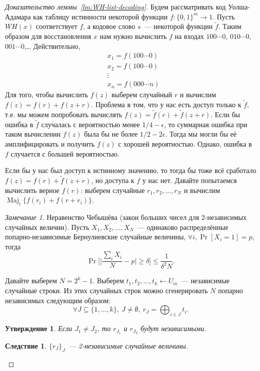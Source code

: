 \documentclass[12pt]{article}
\DeclareMathOperator{\maj}{Maj}
\theoremstyle{definition}
\theoremstyle{plain}
\newtheorem{statement}{Утверждение}[section]
\newtheorem{corollary}{Следствие}[section]
\theoremstyle{remark}
\newtheorem{remark}{Замечание}[section]
\begin{document}
\begin{proof}[Доказательство леммы~\ref*{lm:WH-list-decoding}]
Будем рассматривать код Уолша-Адамара как таблицу истинности некоторой функции $f:\{0,1\}^m\to 1$.
Пусть $WH(x)$ соответствует $f$, а кодовое слово $s$~--- некоторой функции $\tilde{f}$. Таким 
образом для восстановления $x$ нам нужно вычислить $f$ на входах $100\dotsb0$, $010\dotsb0$, $001\dotsb0$,\ldots
Действительно, 
$$
\begin{aligned}
&x_1 = f(100\dotsb0)\\
&x_2 = f(100\dotsb0)\\
&\vdots\\
&x_n = f(000\dotsb n)
\end{aligned}
$$
Для того, чтобы вычислить $f(z)$ выберем случайный $r$ и вычислим
$f(z) = f(r) + f(z + r).$
Проблема в том, что у нас есть доступ только к $\tilde{f}$, т.е.
мы можем попробовать вычислять $f(z) = \tilde{f}(r) + \tilde{f}(z + r).$
Если бы ошибка в $\tilde{f}$ случалась с вероятностью менее $1/4-\epsilon$,
то суммарная ошибка при таком вычислении $f(z)$ была бы не более $1/2 - 2\epsilon$.
Тогда мы могли бы её амплифицировать и получить $f(z)$ с хорошей вероятностью.
Однако, ошибка в $f$ случается с большей вероятностью.

Если бы у нас был доступ к истинному значению, то тогда бы тоже всё сработало
$f(z) = f(r) + \tilde{f}(z + r)$, но доступа к $f$ у нас нет. Давайте попытаемся
вычислить верное $f(r)$: выберем случайные $r_1,r_2,\dotsc,r_N$ и вычислим $\maj_i\{f(r_i) + f(r + r_i)\}$.

\begin{remark}{Неравенство Чебышёва (закон больших чисел для 2-независимых случайных величин).}
Пусть $X_1,X_2,\dotsc,X_N$~--- одинаково распределённые попарно-независимые 
Бернулиевские случайные величины, $\forall i, \Pr[X_i = 1] = p$, тогда
$$\Pr\Biggl[ \biggl|\frac{\sum_i X_i}{N} - p\biggr| \ge \delta \Biggr]\le \frac{1}{\delta^2 N}.$$
\end{remark}

Давайте выберем $N=2^k - 1$. Выберем $t_1,t_2,\dotsc,t_k\gets U_m$~--- независимые случайные строки.
Из этих случайных строк можно сгенерировать $N$ попарно независимых следующим образом:
$$\forall J\subseteq \{1,\dotsc,k\},\ J\neq\emptyset,\ r_J = \bigoplus_{i\in J} t_i.$$

\begin{statement}
Если $J_1 \neq J_2$, то $r_{J_1}$ и $r_{J_2}$ будут независимыми.
\end{statement}
\begin{corollary}
$\{r_J\}_J$~--- 2-независимые случайные величины.
\end{corollary}


\end{proof}
\end{document}
